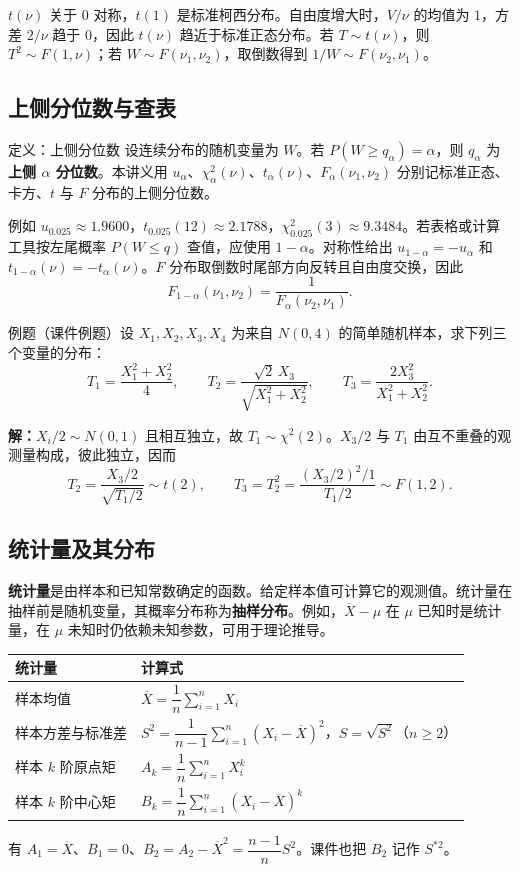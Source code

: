 \documentclass[UTF8,fontset=none,zihao=-4,a4paper]{ctexart}
\newcommand{\term}[1]{\textbf{#1}}
\newcommand{\example}[1]{\begin{infobox}{例题}#1\end{infobox}}
\newcommand{\solution}{\par\noindent\textbf{解：}}
\begin{document}
$t(\nu)$ 关于 $0$ 对称，$t(1)$ 是标准柯西分布。自由度增大时，$V/\nu$ 的均值为 $1$，方差 $2/\nu$ 趋于 $0$，因此 $t(\nu)$ 趋近于标准正态分布。若 $T\sim t(\nu)$，则 $T^2\sim F(1,\nu)$；若 $W\sim F(\nu_1,\nu_2)$，取倒数得到 $1/W\sim F(\nu_2,\nu_1)$。

\subsection{上侧分位数与查表}
\begin{infobox}{定义：上侧分位数}
设连续分布的随机变量为 $W$。若 $P(W\ge q_\alpha)=\alpha$，则 $q_\alpha$ 为\term{上侧 $\alpha$ 分位数}。本讲义用 $u_\alpha$、$\chi^2_\alpha(\nu)$、$t_\alpha(\nu)$、$F_\alpha(\nu_1,\nu_2)$ 分别记标准正态、卡方、$t$ 与 $F$ 分布的上侧分位数。
\end{infobox}
例如 $u_{0.025}\approx1.9600$，$t_{0.025}(12)\approx2.1788$，$\chi^2_{0.025}(3)\approx9.3484$。若表格或计算工具按左尾概率 $P(W\le q)$ 查值，应使用 $1-\alpha$。对称性给出 $u_{1-\alpha}=-u_\alpha$ 和 $t_{1-\alpha}(\nu)=-t_\alpha(\nu)$。$F$ 分布取倒数时尾部方向反转且自由度交换，因此
\[
F_{1-\alpha}(\nu_1,\nu_2)=\frac{1}{F_\alpha(\nu_2,\nu_1)}.
\]

\example{（课件例题）设 $X_1,X_2,X_3,X_4$ 为来自 $N(0,4)$ 的简单随机样本，求下列三个变量的分布：
\[
T_1=\frac{X_1^2+X_2^2}{4},\qquad
T_2=\frac{\sqrt{2}\,X_3}{\sqrt{X_1^2+X_2^2}},\qquad
T_3=\frac{2X_3^2}{X_1^2+X_2^2}.
\]}
\solution $X_i/2\sim N(0,1)$ 且相互独立，故 $T_1\sim\chi^2(2)$。$X_3/2$ 与 $T_1$ 由互不重叠的观测量构成，彼此独立，因而
\[
T_2=\frac{X_3/2}{\sqrt{T_1/2}}\sim t(2),\qquad
T_3=T_2^2=\frac{(X_3/2)^2/1}{T_1/2}\sim F(1,2).
\]

\subsection{统计量及其分布}
\term{统计量}是由样本和已知常数确定的函数。给定样本值可计算它的观测值。统计量在抽样前是随机变量，其概率分布称为\term{抽样分布}。例如，$\overline X-\mu$ 在 $\mu$ 已知时是统计量，在 $\mu$ 未知时仍依赖未知参数，可用于理论推导。

\begin{center}\begin{tabularx}{\linewidth}{l Y}
\toprule 统计量 & 计算式\\\midrule
样本均值 & $\overline X=\dfrac{1}{n}\displaystyle\sum_{i=1}^n X_i$\\
样本方差与标准差 & $S^2=\dfrac{1}{n-1}\displaystyle\sum_{i=1}^n(X_i-\overline X)^2$，$S=\sqrt{S^2}$（$n\ge2$）\\
样本 $k$ 阶原点矩 & $A_k=\dfrac{1}{n}\displaystyle\sum_{i=1}^n X_i^k$\\
样本 $k$ 阶中心矩 & $B_k=\dfrac{1}{n}\displaystyle\sum_{i=1}^n(X_i-\overline X)^k$\\
\bottomrule
\end{tabularx}\end{center}
有 $A_1=\overline X$、$B_1=0$、$B_2=A_2-\overline X^2=\dfrac{n-1}{n}S^2$。课件也把 $B_2$ 记作 $S^{*2}$。
\end{document}

